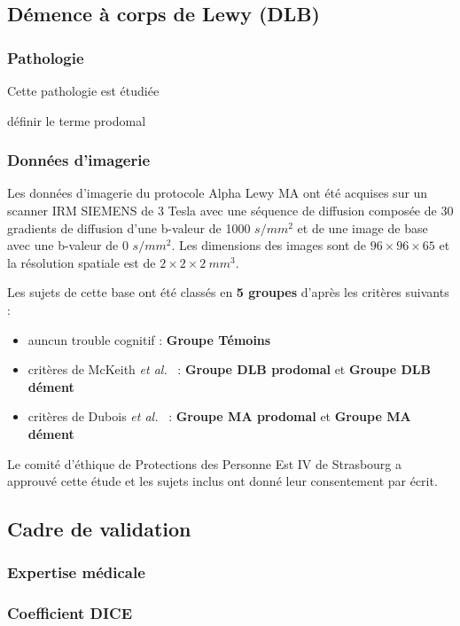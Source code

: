 \subsection{Démence à corps de Lewy (DLB)}
\subsubsection*{Pathologie}
Cette pathologie est étudiée \cite{Heitz2014}

définir le terme prodomal


\subsubsection*{Données d'imagerie}
Les données d'imagerie du protocole \og Alpha Lewy MA \fg ont été acquises sur un scanner IRM SIEMENS de 3 Tesla avec une séquence de diffusion composée de 30 gradients de diffusion 
d'une b-valeur de 1000 $s/mm^2$ et de une image de base avec une b-valeur de 0 $s/mm^2$.
Les dimensions des images sont de $96\times96\times65$ et la résolution spatiale est de $2\times2\times2\ mm^3$.

Les sujets de cette base ont été classés en \textbf{5 groupes} d'après les critères suivants :
\begin{itemize}
    \item auncun trouble cognitif : \textbf{Groupe Témoins}
    \item critères de McKeith \textit{et al.}~\cite{McKeith2005} : \textbf{Groupe DLB prodomal} et \textbf{Groupe DLB dément}
    \item critères de Dubois \textit{et al.}~\cite{Dubois2007} : \textbf{Groupe MA prodomal} et \textbf{Groupe MA dément}
\end{itemize}

Le comité d'éthique de Protections des Personne Est IV de Strasbourg a approuvé cette étude 
et les sujets inclus ont donné leur consentement par écrit.

\subsection{Cadre de validation}

\subsubsection*{Expertise médicale}

\subsubsection*{Coefficient DICE}



